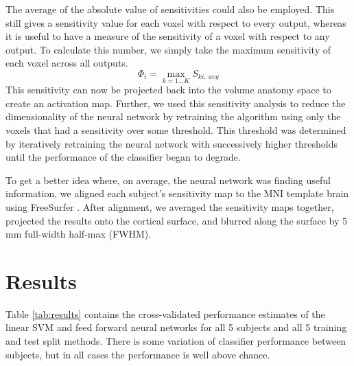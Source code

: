\documentclass[preprint,5p,authoryear]{elsarticle}
\begin{document}
The average of the absolute value of sensitivities could also be employed.
This still gives a sensitivity value for each voxel with respect to every output, whereas it is useful to have a measure of the sensitivity of a voxel with respect to any output.
To calculate this number, we simply take the maximum sensitivity of each voxel across all outputs.
\begin{equation}
\Phi_{i} = \max_{k=1 \dots K}{S_{ki,~avg}}
\end{equation}
This sensitivity can now be projected back into the volume anatomy space to create an activation map.
Further, we used this sensitivity analysis to reduce the dimensionality of the neural network by retraining the algorithm using only the voxels that had a sensitivity over some threshold.
This threshold was determined by iteratively retraining the neural network with successively higher thresholds until the performance of the classifier began to degrade.

To get a better idea where, on average, the neural network was finding useful information, we aligned each subject's sensitivity map to the MNI template brain using FreeSurfer \citep{FreeSurfer}.
After alignment, we averaged the sensitivity maps together, projected the results onto the cortical surface, and blurred along the surface by 5 mm full-width half-max (FWHM).

\section{Results}
Table \ref{tab:results} contains the cross-validated performance estimates of the linear SVM and feed forward neural networks for all 5 subjects and all 5 training and test split methods.
There is some variation of classifier performance between subjects, but in all cases the performance is well above chance. 
\end{document}
